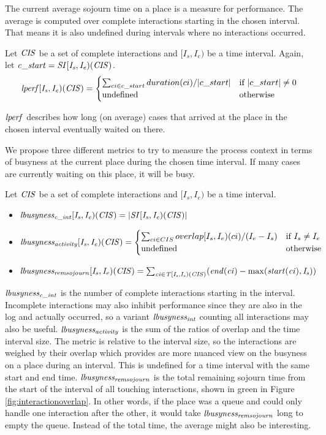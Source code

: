 The current average sojourn time on a place is a measure for performance. The average is computed over complete interactions starting in the chosen interval. That means it is also undefined during intervals where no interactions occurred.
\begin{definition}
Let $\mathit{CIS}$ be a set of complete interactions and $[I_s, I_e)$ be a time interval. Again, let $\mathit{c\_start = SI[I_s, I_e)(\mathit{CIS})}$.
$$\mathit{lperf[I_s,I_e)( \mathit{CIS} ) = \begin{cases} \sum_{ci\in c\_start} duration(ci) / |c\_start| & \text{if } |c\_start|\neq 0\\
\text{undefined} & \text{otherwise} \end{cases}}$$
\end{definition}
$\mathit{lperf}$ describes how long (on average) cases that arrived at the place in the chosen interval eventually waited on there.

We propose three different metrics to try to measure the process context in terms of busyness at the current place during the chosen time interval. If many cases are currently waiting on this place, it will be busy.
\begin{definition}
Let $\mathit{CIS}$ be a set of complete interactions and $[I_s,I_e)$ be a time interval.
\begin{itemize}
    \item $\mathit{lbusyness_{c\_int}[I_s,I_e)( \mathit{CIS}) = |SI[I_s,I_e)(CIS)|}$
    \item $\mathit{lbusyness_{activity}[I_s,I_e)( \mathit{CIS} ) = \begin{cases} \sum_{ci \in CIS} overlap[I_s,I_e)(ci)/(I_e - I_s) & \text{if } I_s \neq I_e\\
    \text{undefined} & \text{otherwise} \end{cases}}$
    \item $\mathit{lbusyness_{remsojourn}[I_s,I_e)( \mathit{CIS} ) = \sum_{ci\in T[I_s,I_e)(CIS)} (end(ci) - \max(start(ci),I_s))}$
\end{itemize}
\end{definition}

$\mathit{lbusyness_{c\_int}}$ is the number of complete interactions starting in the interval. Incomplete interactions may also inhibit performance since they are also in the log and actually occurred, so a variant $\mathit{lbusyness_{int}}$ counting all interactions may also be useful.
$\mathit{lbusyness_{activity}}$ is the sum of the ratios of overlap and the time interval size. The metric is relative to the interval size, so the interactions are weighed by their overlap which provides are more nuanced view on the busyness on a place during an interval. This is undefined for a time interval with the same start and end time.
$\mathit{lbusyness_{remsojourn}}$ is the total remaining sojourn time from the start of the interval of all touching interactions, shown in green in Figure \ref{fig:interactionoverlap}. In other words, if the place was a queue and could only handle one interaction after the other, it would take $\mathit{lbusyness_{remsojourn}}$ long to empty the queue. Instead of the total time, the average might also be interesting.

